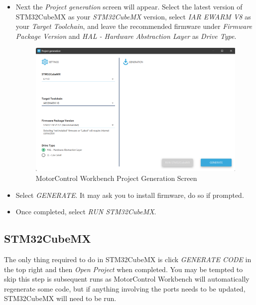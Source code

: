 \documentclass[10pt]{article}
\begin{document}
\begin{itemize}
                \item Next the \emph{Project generation} screen will appear. Select the latest version of STM32CubeMX as your \emph{STM32CubeMX} version, select \emph{IAR EWARM V8} as your \emph{Target Toolchain}, and leave the recommended firmware under \emph{Firmware Package Version} and \emph{HAL - Hardware Abstraction Layer} as \emph{Drive Type}.
                    \begin{figure}[H]
                        \centerline{\includegraphics[width=\textwidth]{References/MCW Project Gen.png}}
                        \caption{MotorControl Workbench Project Generation Screen}
                    \end{figure}
                \item Select \emph{GENERATE}. It may ask you to install firmware, do so if prompted.
                \item Once completed, select \emph{RUN STM32CubeMX}.
            \end{itemize}
		\FloatBarrier \subsection{STM32CubeMX}
            The only thing required to do in STM32CubeMX is click \emph{GENERATE CODE} in the top right and then \emph{Open Project} when completed. You may be tempted to skip this step is subsequent runs as MotorControl Workbench will automatically regenerate some code, but if anything involving the ports needs to be updated, STM32CubeMX will need to be run.
\end{document}
